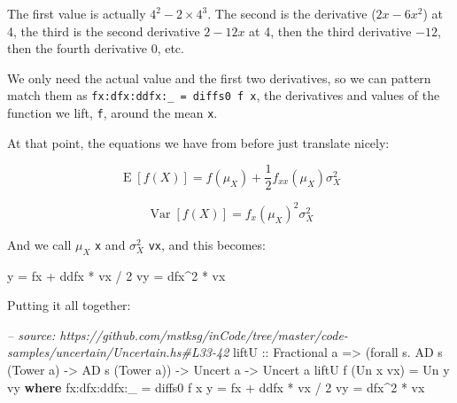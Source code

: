 \documentclass[]{article}
\newenvironment{Shaded}{}{}
\newcommand{\KeywordTok}[1]{\textcolor[rgb]{0.00,0.44,0.13}{\textbf{{#1}}}}
\newcommand{\DataTypeTok}[1]{\textcolor[rgb]{0.56,0.13,0.00}{{#1}}}
\newcommand{\DecValTok}[1]{\textcolor[rgb]{0.25,0.63,0.44}{{#1}}}
\newcommand{\CommentTok}[1]{\textcolor[rgb]{0.38,0.63,0.69}{\textit{{#1}}}}
\newcommand{\OtherTok}[1]{\textcolor[rgb]{0.00,0.44,0.13}{{#1}}}
\newcommand{\FunctionTok}[1]{\textcolor[rgb]{0.02,0.16,0.49}{{#1}}}
\newcommand{\NormalTok}[1]{{#1}}
\begin{document}
The first value is actually \(4^2 - 2 \times 4^3\). The second is the
derivative (\(2 x - 6x^2\)) at 4, the third is the second derivative
\(2 - 12 x\) at 4, then the third derivative \(-12\), then the fourth
derivative \(0\), etc.

We only need the actual value and the first two derivatives, so we can
pattern match them as \texttt{fx:dfx:ddfx:\_\ =\ diffs0\ f\ x}, the
derivatives and values of the function we lift, \texttt{f}, around the
mean \texttt{x}.

At that point, the equations we have from before just translate nicely:

\[
\operatorname{E}[f(X)] = f(\mu_X) + \frac{1}{2} f_{xx}(\mu_X) \sigma_X^2
\]

\[
\operatorname{Var}[f(X)] = f_x(\mu_X)^2 \sigma_X^2
\]

And we call \(\mu_X\) \texttt{x} and \(\sigma_X^2\) \texttt{vx}, and
this becomes:

\begin{Shaded}
\begin{Highlighting}[]
\NormalTok{y  }\FunctionTok{=} \NormalTok{fx }\FunctionTok{+} \NormalTok{ddfx }\FunctionTok{*} \NormalTok{vx }\FunctionTok{/} \DecValTok{2}
\NormalTok{vy }\FunctionTok{=} \NormalTok{dfx}\FunctionTok{^}\DecValTok{2} \FunctionTok{*} \NormalTok{vx}
\end{Highlighting}
\end{Shaded}

Putting it all together:

\begin{Shaded}
\begin{Highlighting}[]
\CommentTok{-- source: https://github.com/mstksg/inCode/tree/master/code-samples/uncertain/Uncertain.hs#L33-42}
\NormalTok{liftU}
\OtherTok{    ::} \DataTypeTok{Fractional} \NormalTok{a}
    \OtherTok{=>} \NormalTok{(forall s}\FunctionTok{.} \DataTypeTok{AD} \NormalTok{s (}\DataTypeTok{Tower} \NormalTok{a) }\OtherTok{->} \DataTypeTok{AD} \NormalTok{s (}\DataTypeTok{Tower} \NormalTok{a))}
    \OtherTok{->} \DataTypeTok{Uncert} \NormalTok{a}
    \OtherTok{->} \DataTypeTok{Uncert} \NormalTok{a}
\NormalTok{liftU f (}\DataTypeTok{Un} \NormalTok{x vx) }\FunctionTok{=} \DataTypeTok{Un} \NormalTok{y vy}
  \KeywordTok{where}
    \NormalTok{fx}\FunctionTok{:}\NormalTok{dfx}\FunctionTok{:}\NormalTok{ddfx}\FunctionTok{:}\NormalTok{_ }\FunctionTok{=} \NormalTok{diffs0 f x}
    \NormalTok{y             }\FunctionTok{=} \NormalTok{fx }\FunctionTok{+} \NormalTok{ddfx }\FunctionTok{*} \NormalTok{vx }\FunctionTok{/} \DecValTok{2}
    \NormalTok{vy            }\FunctionTok{=} \NormalTok{dfx}\FunctionTok{^}\DecValTok{2} \FunctionTok{*} \NormalTok{vx}
\end{Highlighting}
\end{Shaded}
\end{document}

